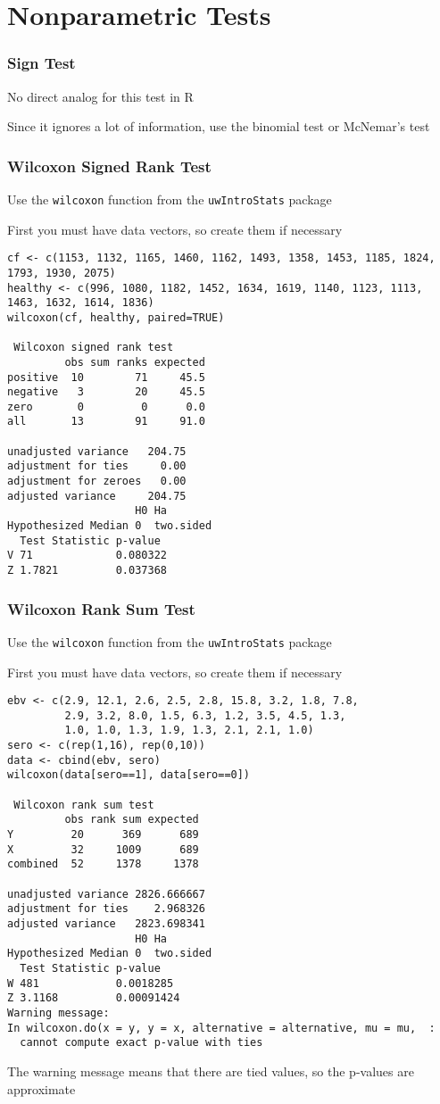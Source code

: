 \documentclass[pdf]{beamer}
\begin{document}
\section{Nonparametric Tests}
\begin{frame}[fragile]
\frametitle{Sign Test}
No direct analog for this test in R

Since it ignores a lot of information, use the binomial test or McNemar's test
\end{frame}
\begin{frame}[fragile]
\frametitle{Wilcoxon Signed Rank Test}
Use the \texttt{wilcoxon} function from the \texttt{uwIntroStats} package

First you must have data vectors, so create them if necessary

{\fontsize{6pt}{7.2}\selectfont
\begin{verbatim}
cf <- c(1153, 1132, 1165, 1460, 1162, 1493, 1358, 1453, 1185, 1824, 1793, 1930, 2075)
healthy <- c(996, 1080, 1182, 1452, 1634, 1619, 1140, 1123, 1113, 1463, 1632, 1614, 1836)
wilcoxon(cf, healthy, paired=TRUE)
 
 Wilcoxon signed rank test 
         obs sum ranks expected
positive  10        71     45.5
negative   3        20     45.5
zero       0         0      0.0
all       13        91     91.0
                            
unadjusted variance   204.75
adjustment for ties     0.00
adjustment for zeroes   0.00
adjusted variance     204.75
                    H0 Ha       
Hypothesized Median 0  two.sided
  Test Statistic p-value 
V 71             0.080322
Z 1.7821         0.037368
\end{verbatim}}
\end{frame}

\begin{frame}[fragile]
\frametitle{Wilcoxon Rank Sum Test}
Use the \texttt{wilcoxon} function from the \texttt{uwIntroStats} package

First you must have data vectors, so create them if necessary

{\fontsize{6pt}{4.2}\selectfont
\begin{verbatim}
ebv <- c(2.9, 12.1, 2.6, 2.5, 2.8, 15.8, 3.2, 1.8, 7.8, 
         2.9, 3.2, 8.0, 1.5, 6.3, 1.2, 3.5, 4.5, 1.3, 
         1.0, 1.0, 1.3, 1.9, 1.3, 2.1, 2.1, 1.0) 
sero <- c(rep(1,16), rep(0,10))
data <- cbind(ebv, sero)
wilcoxon(data[sero==1], data[sero==0])

 Wilcoxon rank sum test 
         obs rank sum expected
Y         20      369      689
X         32     1009      689
combined  52     1378     1378
                               
unadjusted variance 2826.666667
adjustment for ties    2.968326
adjusted variance   2823.698341
                    H0 Ha       
Hypothesized Median 0  two.sided
  Test Statistic p-value   
W 481            0.0018285 
Z 3.1168         0.00091424
Warning message:
In wilcoxon.do(x = y, y = x, alternative = alternative, mu = mu,  :
  cannot compute exact p-value with ties
\end{verbatim}}
The warning message means that there are tied values, so the p-values are approximate
\end{frame}
\end{document}
